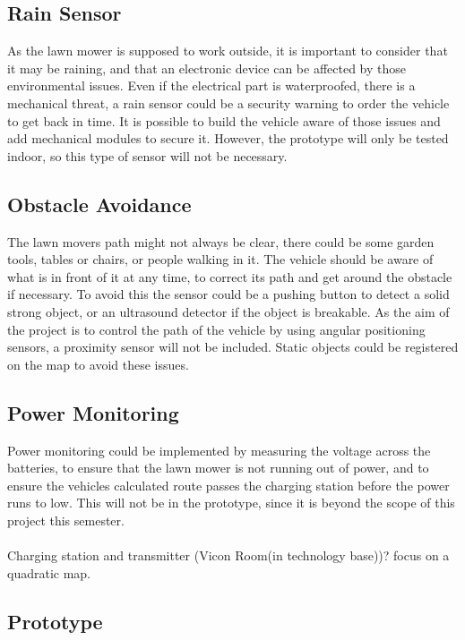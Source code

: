 \subsection{Rain Sensor}
As the lawn mower is supposed to work outside, it is important to consider that it may be raining, and that an electronic device can be affected by those environmental issues. Even if the electrical part is waterproofed, there is a mechanical threat, a rain sensor could be a security warning to order the vehicle to get back in time.
It is possible to build the vehicle aware of those issues and add mechanical modules to secure it. However, the prototype will only be tested indoor, so this type of sensor will not be necessary.

\subsection{Obstacle Avoidance}
The lawn movers path might not always be clear, there could be some garden tools, tables or chairs, or people walking in it. The vehicle should be aware of what is in front of it at any time, to correct its path and get around the obstacle if necessary. To avoid this the sensor could be a pushing button to detect a solid strong object, or an ultrasound detector if the object is breakable.
As the aim of the project is to control the path of the vehicle by using angular positioning sensors, a proximity sensor will not be included. Static objects could be registered on the map to avoid these issues.

\subsection{Power Monitoring}
Power monitoring could be implemented by measuring the voltage across the batteries, to ensure that the lawn mower is not running out of power, and to ensure the vehicles calculated route passes the charging station before the power runs to low. 
This will not be in the prototype, since it is beyond the scope of this project this semester.\\\\

Charging station and transmitter (Vicon Room(in technology base))? focus on a quadratic map. 

\subsection{Prototype}


